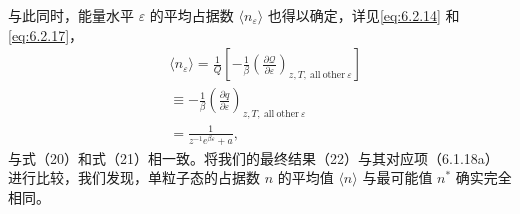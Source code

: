 与此同时，能量水平 \(\varepsilon\) 的平均占据数 \(\langle n_{\varepsilon}\rangle\) 也得以确定，详见\autoref{eq:6.2.14} 和\autoref{eq:6.2.17}，
\begin{equation}\tag{6.2.22}\label{eq:6.2.22}
\begin{array}{rl} & { \langle n _ { \varepsilon } \rangle = \frac { 1 } { Q } \left[ - \frac { 1 } { \beta } \left( \frac { \partial \mathcal { Q } } { \partial \varepsilon } \right) _ { z , T , \mathrm { ~ a l l ~ o t h e r ~ } \varepsilon } \right] } \\& { \equiv - \frac { 1 } { \beta } \left( \frac { \partial q } { \partial \varepsilon } \right) _ { z , T , \mathrm { ~ a l l ~ o t h e r ~ } \varepsilon } } \\& { = \frac { 1 } { z ^{- 1} e ^{\beta \varepsilon} + a } , } \end{array}
\end{equation}
与式（20）和式（21）相一致。将我们的最终结果（22）与其对应项（6.1.18a）进行比较，我们发现，单粒子态的占据数 \(n\) 的平均值 \(\langle n \rangle\) 与最可能值 \(n^{*}\) 确实完全相同。
